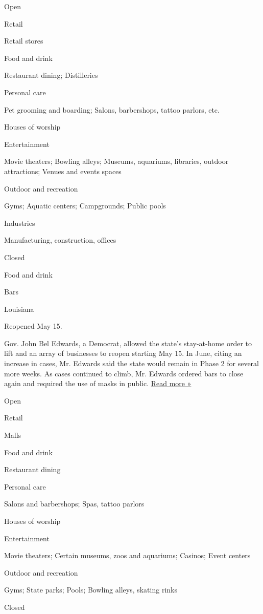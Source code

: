 Open

Retail

Retail stores

Food and drink

Restaurant dining; Distilleries

Personal care

Pet grooming and boarding; Salons, barbershops, tattoo parlors, etc.

Houses of worship

Entertainment

Movie theaters; Bowling alleys; Museums, aquariums, libraries, outdoor
attractions; Venues and events spaces

Outdoor and recreation

Gyms; Aquatic centers; Campgrounds; Public pools

Industries

Manufacturing, construction, offices

Closed

Food and drink

Bars

Louisiana

Reopened May 15.

Gov. John Bel Edwards, a Democrat, allowed the state's stay-at-home
order to lift and an array of businesses to reopen starting May 15. In
June, citing an increase in cases, Mr. Edwards said the state would
remain in Phase 2 for several more weeks. As cases continued to climb,
Mr. Edwards ordered bars to close again and required the use of masks in
public.
\href{https://www.theadvocate.com/baton_rouge/news/coronavirus/article_06904936-d122-11ea-ba80-37555176f8af.html}{Read
more »}

Open

Retail

Malls

Food and drink

Restaurant dining

Personal care

Salons and barbershops; Spas, tattoo parlors

Houses of worship

Entertainment

Movie theaters; Certain museums, zoos and aquariums; Casinos; Event
centers

Outdoor and recreation

Gyms; State parks; Pools; Bowling alleys, skating rinks

Closed

